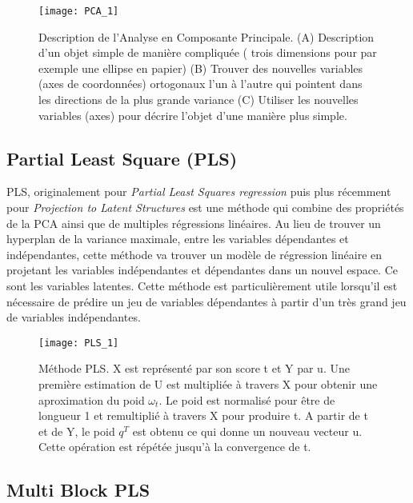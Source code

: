 \begin{figure}[H]
	\caption{\label{PCAdefinition} Description de l'Analyse en Composante Principale. (A) Description d'un objet simple de manière compliquée ( trois dimensions pour par exemple une ellipse en papier) (B) Trouver des nouvelles variables (axes de coordonnées) ortogonaux l'un à l'autre qui pointent dans les directions de la plus grande variance (C) Utiliser les nouvelles variables (axes) pour décrire l'objet d'une manière plus simple. }
	\texttt{[image: PCA\_1]}
\end{figure}

\newpage
\subsection{Partial Least Square (PLS)}


PLS, originalement pour \textit{Partial Least Squares regression} puis plus récemment pour \textit{Projection to Latent Structures} est une méthode qui combine des propriétés de la PCA ainsi que de multiples régressions linéaires. Au lieu de trouver un hyperplan de la variance maximale, entre les variables dépendantes et indépendantes, cette méthode va trouver un modèle de régression linéaire en projetant les variables indépendantes et dépendantes dans un nouvel espace. Ce sont les variables latentes. Cette méthode est particulièrement utile lorsqu'il est nécessaire de prédire un jeu de variables dépendantes à partir d'un très grand jeu de variables indépendantes. 

\begin{figure}[H]
	\texttt{[image: PLS\_1]}
	\caption{\label{PLSschema}Méthode PLS. X est représenté par son score t et Y par u. Une première estimation de U est multipliée à travers X pour obtenir une aproximation du poid $ \omega_t $. Le poid est normalisé pour être de longueur 1 et remultiplié à travers X pour produire t. A partir de t et de Y, le poid $ q^T $ est obtenu ce qui donne un nouveau vecteur u. Cette opération est répétée jusqu'à la convergence de t.}
\end{figure}

\subsection{Multi Block PLS}


